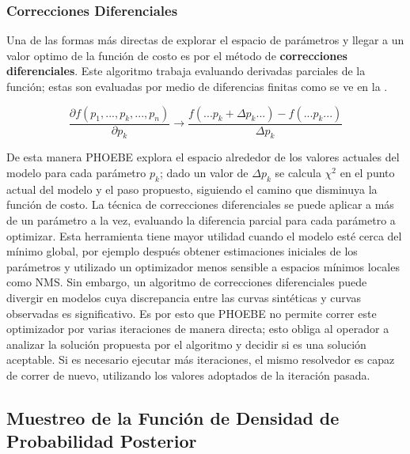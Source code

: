 \subsubsection{Correcciones Diferenciales}

Una de las formas más directas de explorar el espacio de parámetros y llegar a
un valor optimo de la función de costo es por el método de \textbf{correcciones
diferenciales}. Este algoritmo trabaja evaluando derivadas parciales de la
función; estas son evaluadas por medio de diferencias finitas como se ve en la
.

\begin{eqfloat}[!ht]
	\centering
	\begin{equation}
		\frac{\partial f(p_1,...,p_k,...,p_n)}{\partial p_k} \rightarrow \frac{f(...p_k + \Delta p_k...) - f(...p_k...)}{\Delta p_k}
	\end{equation}
	\blankcaption
	\vspace{-0.4em}
	\label{ecuacionDiferenciasFinitas}
\end{eqfloat}

De esta manera PHOEBE explora el espacio alrededor de los valores actuales del
modelo para cada parámetro $p_k$; dado un valor de $\Delta p_k$ se calcula
$\chi^2$ en el punto actual del modelo y el paso propuesto, siguiendo el camino
que disminuya la función de costo. La técnica de correcciones diferenciales se
puede aplicar a más de un parámetro a la vez, evaluando la diferencia parcial
para cada parámetro a optimizar. Esta herramienta tiene mayor utilidad cuando el
modelo esté cerca del mínimo global, por ejemplo después obtener estimaciones
iniciales de los parámetros y utilizado un optimizador menos sensible a espacios
mínimos locales como NMS. Sin embargo, un algoritmo de correcciones
diferenciales puede divergir en modelos cuya discrepancia entre las curvas
sintéticas y curvas observadas es significativo. Es por esto que PHOEBE no
permite correr este optimizador por varias iteraciones de manera directa; esto
obliga al operador a analizar la solución propuesta por el algoritmo y decidir
si es una solución aceptable. Si es necesario ejecutar más iteraciones, el mismo
resolvedor es capaz de correr de nuevo, utilizando los valores adoptados de la
iteración pasada.

\subsection{Muestreo de la Función de Densidad de Probabilidad Posterior}

